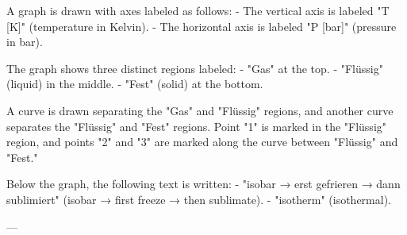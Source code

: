 A graph is drawn with axes labeled as follows:  
- The vertical axis is labeled "T [K]" (temperature in Kelvin).  
- The horizontal axis is labeled "P [bar]" (pressure in bar).  

The graph shows three distinct regions labeled:  
- "Gas" at the top.  
- "Flüssig" (liquid) in the middle.  
- "Fest" (solid) at the bottom.  

A curve is drawn separating the "Gas" and "Flüssig" regions, and another curve separates the "Flüssig" and "Fest" regions.  
Point "1" is marked in the "Flüssig" region, and points "2" and "3" are marked along the curve between "Flüssig" and "Fest."  

Below the graph, the following text is written:  
- "isobar → erst gefrieren → dann sublimiert" (isobar → first freeze → then sublimate).  
- "isotherm" (isothermal).  

---